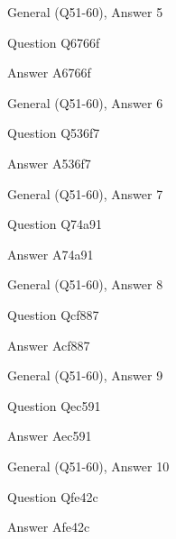 \documentclass[11pt]{beamer}
\begin{document}
\begin{frame}[t]{General (Q51-60), Answer 5}
\vspace{2em}
\begin{block}{Question}
Q6766f
\end{block}
\pause{}
\begin{block}{Answer}
A6766f
\end{block}
\end{frame}
    

\begin{frame}[t]{General (Q51-60), Answer 6}
\vspace{2em}
\begin{block}{Question}
Q536f7
\end{block}
\pause{}
\begin{block}{Answer}
A536f7
\end{block}
\end{frame}
    

\begin{frame}[t]{General (Q51-60), Answer 7}
\vspace{2em}
\begin{block}{Question}
Q74a91
\end{block}
\pause{}
\begin{block}{Answer}
A74a91
\end{block}
\end{frame}
    

\begin{frame}[t]{General (Q51-60), Answer 8}
\vspace{2em}
\begin{block}{Question}
Qcf887
\end{block}
\pause{}
\begin{block}{Answer}
Acf887
\end{block}
\end{frame}
    

\begin{frame}[t]{General (Q51-60), Answer 9}
\vspace{2em}
\begin{block}{Question}
Qec591
\end{block}
\pause{}
\begin{block}{Answer}
Aec591
\end{block}
\end{frame}
    

\begin{frame}[t]{General (Q51-60), Answer 10}
\vspace{2em}
\begin{block}{Question}
Qfe42c
\end{block}
\pause{}
\begin{block}{Answer}
Afe42c
\end{block}
\end{frame}
    
\end{document}
